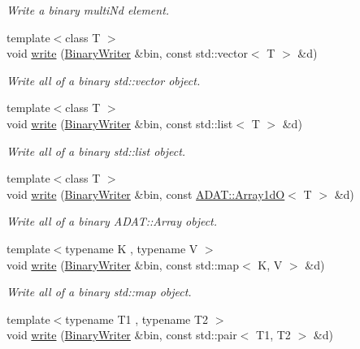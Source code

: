 \begin{DoxyCompactItemize}
\begin{DoxyCompactList}\small\item\em Write a binary multi\+Nd element. \end{DoxyCompactList}\item 
{\footnotesize template$<$class T $>$ }\\void \mbox{\hyperlink{namespaceADATIO_a588c700d58adcb2b77399ac18ec9226b}{write}} (\mbox{\hyperlink{classADATIO_1_1BinaryWriter}{Binary\+Writer}} \&bin, const std\+::vector$<$ T $>$ \&d)
\begin{DoxyCompactList}\small\item\em Write all of a binary std\+::vector object. \end{DoxyCompactList}\item 
{\footnotesize template$<$class T $>$ }\\void \mbox{\hyperlink{namespaceADATIO_a940fb003df0f6107d020341f78592201}{write}} (\mbox{\hyperlink{classADATIO_1_1BinaryWriter}{Binary\+Writer}} \&bin, const std\+::list$<$ T $>$ \&d)
\begin{DoxyCompactList}\small\item\em Write all of a binary std\+::list object. \end{DoxyCompactList}\item 
{\footnotesize template$<$class T $>$ }\\void \mbox{\hyperlink{namespaceADATIO_aea9e3ff6a488ce22e363d16085c76a85}{write}} (\mbox{\hyperlink{classADATIO_1_1BinaryWriter}{Binary\+Writer}} \&bin, const \mbox{\hyperlink{classADAT_1_1Array1dO}{A\+D\+A\+T\+::\+Array1dO}}$<$ T $>$ \&d)
\begin{DoxyCompactList}\small\item\em Write all of a binary A\+D\+A\+T\+::\+Array object. \end{DoxyCompactList}\item 
{\footnotesize template$<$typename K , typename V $>$ }\\void \mbox{\hyperlink{namespaceADATIO_acc2655a91a7a0608906b55f7533bde55}{write}} (\mbox{\hyperlink{classADATIO_1_1BinaryWriter}{Binary\+Writer}} \&bin, const std\+::map$<$ K, V $>$ \&d)
\begin{DoxyCompactList}\small\item\em Write all of a binary std\+::map object. \end{DoxyCompactList}\item 
{\footnotesize template$<$typename T1 , typename T2 $>$ }\\void \mbox{\hyperlink{namespaceADATIO_a29572ec079e7257de618b505e0baee59}{write}} (\mbox{\hyperlink{classADATIO_1_1BinaryWriter}{Binary\+Writer}} \&bin, const std\+::pair$<$ T1, T2 $>$ \&d)

\end{DoxyCompactItemize}
